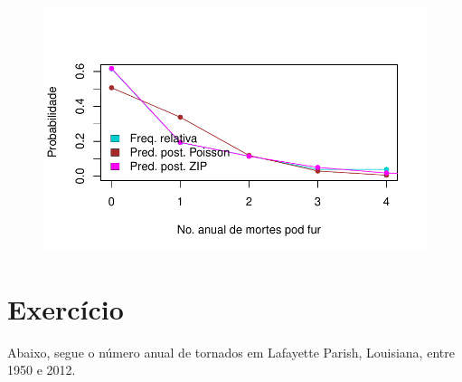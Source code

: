 \documentclass[
  letterpaper,
  DIV=11,
  numbers=noendperiod]{scrreprt}
\theoremstyle{definition}
\theoremstyle{definition}
\theoremstyle{remark}
\begin{document}
\begin{figure}[H]

{\centering \includegraphics{misturas_files/figure-pdf/unnamed-chunk-6-1.pdf}

}

\end{figure}

\hypertarget{exercuxedcio}{%
\section{Exercício}\label{exercuxedcio}}

Abaixo, segue o número anual de tornados em Lafayette Parish, Louisiana,
entre 1950 e 2012.
\end{document}
